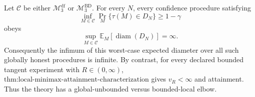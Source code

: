 Let \(\mathcal C\) be either \(\mathcal M_3^{\mathrm{df}}\) or \(\mathcal M_3^{\mathrm{BD}}\).  For every \(N\), every confidence procedure satisfying
\[
 \inf_{M\in\mathcal C}\Pr_M\{\tau(M)\in D_N\}\ge1-\gamma
\]
obeys
\[
 \sup_{M\in\mathcal C}\mathbb E_M\!\left[\operatorname{diam}(D_N)\right]=\infty.
\]
Consequently the infimum of this worst-case expected diameter over all such globally honest procedures is infinite.  By contrast, for every declared bounded tangent experiment with \(R\in(0,\infty)\), \(\text{thm:local-minimax-attainment-characterization}\) gives \(v_R<\infty\) and attainment.  Thus the theory has a global-unbounded versus bounded-local elbow.